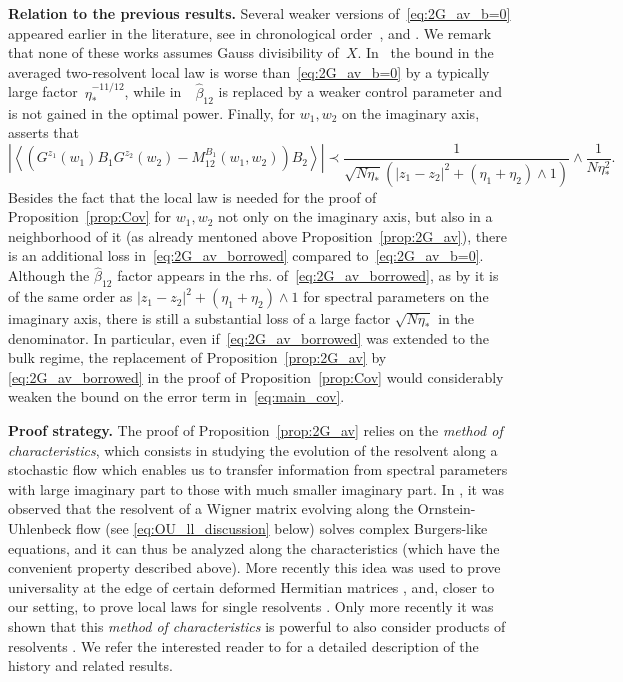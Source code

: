 \documentclass[10pt]{amsart}
\numberwithin{equation}{section}
\begin{document}
\smallskip

\textbf{Relation to the previous results.} Several weaker versions of~\eqref{eq:2G_av_b=0} appeared earlier in the literature, see in chronological order~\cite[Theorem~5.2]{macroCLT_complex}, \cite[Theorem~3.3]{Cipolloni_meso} and \cite[Theorem~3.4]{nonHermdecay}. We remark that none of these works assumes Gauss divisibility of~$X$. In~\cite{macroCLT_complex} the bound in the averaged two-resolvent local law is worse than~\eqref{eq:2G_av_b=0} by a typically large factor~$\eta_*^{-11/12}$, while in~\cite{Cipolloni_meso}~$\widehat{\beta}_{12}$ is replaced by a weaker control parameter and is not gained in the optimal power. Finally, for $w_1,w_2$ on the imaginary axis, \cite[Theorem~3.4]{nonHermdecay} asserts that
\begin{equation}
\left\vert \left\langle \left(G^{z_1}(w_1)B_1G^{z_2}(w_2)-M_{12}^{B_1}(w_1,w_2)\right)B_2\right\rangle\right\vert \prec \frac{1}{\sqrt{N\eta_*}\left(|z_1-z_2|^2 + (\eta_1+\eta_2)\wedge 1\right)}\wedge \frac{1}{N\eta_*^2}.
\label{eq:2G_av_borrowed}
\end{equation}
Besides the fact that the local law is needed for the proof of Proposition~\ref{prop:Cov} for $w_1,w_2$ not only on the imaginary axis, but also in a neighborhood of it (as already mentoned above Proposition~\ref{prop:2G_av}), there is an additional loss in~\eqref{eq:2G_av_borrowed} compared to~\eqref{eq:2G_av_b=0}. Although the $\widehat{\beta}_{12}$ factor appears in the rhs. of~\eqref{eq:2G_av_borrowed}, as by \cite[Lemma~3.3]{nonHermdecay} it is of the same order as $|z_1-z_2|^2 + (\eta_1+\eta_2)\wedge 1$ for spectral parameters on the imaginary axis, there is still a substantial loss of a large factor $\sqrt{N\eta_*}$ in the denominator. In particular, even if~\eqref{eq:2G_av_borrowed} was extended to the bulk regime, the replacement of Proposition~\ref{prop:2G_av} by \eqref{eq:2G_av_borrowed} in the proof of Proposition~\ref{prop:Cov} would considerably weaken the bound on the error term in~\eqref{eq:main_cov}.


\smallskip

\textbf{Proof strategy.} The proof of Proposition~\ref{prop:2G_av} relies on the \emph{method of characteristics}, which consists in studying the evolution of the resolvent along a stochastic flow which enables us to transfer information from spectral parameters with large imaginary part to those with much smaller imaginary part. In \cite{pastur1972spectrum}, it was observed that the resolvent of a Wigner matrix evolving along the  Ornstein-Uhlenbeck flow (see \eqref{eq:OU_ll_discussion} below) solves complex Burgers-like equations, and it can thus be analyzed along the characteristics (which have the convenient property described above). More recently this idea was used to prove universality at the edge of certain deformed Hermitian matrices \cite{lee2015edge}, and, closer to our setting, to prove local laws for single resolvents \cite{adhikari2020dyson, HL_rig, von2019random}. Only more recently it was shown that this \emph{method of characteristics} is powerful to also consider products of resolvents \cite{bourgade2022liouville, Cipolloni_meso}. We refer the interested reader to \cite[Section 1.4]{univ_extr} for a detailed description of the history and related results.
\end{document}
